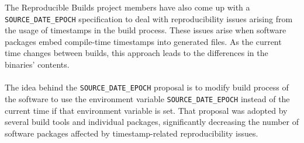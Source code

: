 {The Reproducible Builds project members have also come up with a \texttt{SOURCE\_DATE\_EPOCH} specification\autocite{SDEspec} to deal with reproducibility issues arising from the usage of timestamps in the build process.
These issues arise when software packages embed compile-time timestamps into generated files. As the current time changes between builds, this approach leads to the differences in the binaries' contents. \\\\
The idea behind the \texttt{SOURCE\_DATE\_EPOCH} proposal is to modify build process of the software to use the environment variable \texttt{SOURCE\_DATE\_EPOCH} instead of the current time if that environment variable is set. 
That proposal was adopted by several build tools and individual packages\autocite{SDEproposal}, significantly decreasing the number of software packages affected by timestamp-related reproducibility issues.\\


}




